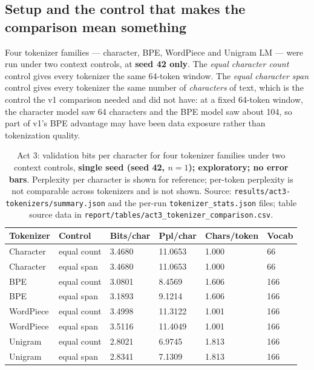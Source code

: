 \documentclass[11pt,a4paper]{article}
\begin{document}
\subsection{Setup and the control that makes the comparison mean something}
\label{sec:act3-setup}

Four tokenizer families --- character, BPE, WordPiece and Unigram LM --- were
run under two context controls, at \textbf{seed 42 only}. The \emph{equal
character count} control gives every tokenizer the same 64-token window. The
\emph{equal character span} control gives every tokenizer the same number of
\emph{characters} of text, which is the control the v1 comparison needed and did
not have: at a fixed 64-token window, the character model saw 64 characters and
the BPE model saw about 104, so part of v1's BPE advantage may have been data
exposure rather than tokenization quality.

\begin{table}[H]
\centering
\begin{tabular}{L{2.4cm}L{2.7cm}R{2.3cm}R{2.3cm}R{2.0cm}R{1.7cm}}
\toprule
Tokenizer & Control & Bits/char & Ppl/char & Chars/token & Vocab \\
\midrule
Character & equal count & 3.4680 & 11.0653 & 1.000 & 66 \\
Character & equal span & 3.4680 & 11.0653 & 1.000 & 66 \\
\midrule
BPE & equal count & 3.0801 & 8.4569 & 1.606 & 166 \\
BPE & equal span & 3.1893 & 9.1214 & 1.606 & 166 \\
\midrule
WordPiece & equal count & 3.4998 & 11.3122 & 1.001 & 166 \\
WordPiece & equal span & 3.5116 & 11.4049 & 1.001 & 166 \\
\midrule
Unigram & equal count & 2.8021 & 6.9745 & 1.813 & 166 \\
Unigram & equal span & 2.8341 & 7.1309 & 1.813 & 166 \\
\bottomrule
\end{tabular}
\caption{Act 3: validation bits per character for four tokenizer families under
two context controls, \textbf{single seed (seed 42, $n = 1$); exploratory; no
error bars}. Perplexity per character is shown for reference; per-token
perplexity is not comparable across tokenizers and is not shown. Source:
\texttt{results/act3-tokenizers/summary.json} and the per-run
\texttt{tokenizer\_stats.json} files; table source data in
\texttt{report/tables/act3\_tokenizer\_comparison.csv}.}
\label{tab:act3}
\end{table}
\end{document}

